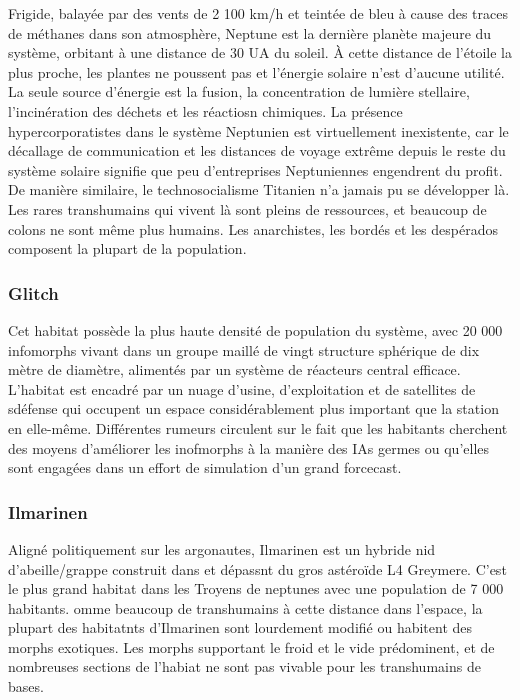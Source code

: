                                                                      Frigide, balayée par des vents de 2 100 km/h et teintée de bleu à cause des traces de méthanes dans son atmosphère, Neptune est la dernière planète majeure du système, orbitant à une distance de 30 UA du soleil. À cette distance de l'étoile la plus proche, les plantes ne poussent pas et l'énergie solaire n'est d'aucune utilité. La seule source d'énergie est la fusion, la concentration de lumière stellaire, l'incinération des déchets et les réactiosn chimiques. La présence hypercorporatistes dans le système Neptunien est virtuellement inexistente, car le décallage de communication et les distances de voyage extrême depuis le reste du système solaire signifie que peu d'entreprises Neptuniennes engendrent du profit. De manière similaire, le technosocialisme Titanien n'a jamais pu se développer là. Les rares transhumains qui vivent là sont pleins de ressources, et beaucoup de colons ne sont même plus humains. Les anarchistes, les bordés et les despérados composent la plupart de la population. 

                                                                     \subsubsection{Glitch} \label{sec:glitch} 

                                                                     Cet habitat possède la plus haute densité de population du système, avec 20 000 infomorphs vivant dans un groupe maillé de vingt structure sphérique de dix mètre de diamètre, alimentés par un système de réacteurs central efficace. L'habitat est encadré par un nuage d'usine, d'exploitation et de satellites de sdéfense qui occupent un espace considérablement plus important que la station en elle-même. Différentes rumeurs circulent sur le fait que les habitants cherchent des moyens d'améliorer les inofmorphs à la manière des IAs germes ou qu'elles sont engagées dans un effort de simulation d'un grand forcecast. 

                                                                     \subsubsection{Ilmarinen} \label{sec:ilmarinen} 

                                                                     Aligné politiquement sur les argonautes, Ilmarinen est un hybride nid d'abeille/grappe construit dans et dépassnt du gros astéroïde L4 Greymere. C'est le plus grand habitat dans les Troyens de neptunes avec une population de 7 000 habitants. omme beaucoup de transhumains à cette distance dans l'espace, la plupart des habitatnts d'Ilmarinen sont lourdement modifié ou habitent des morphs exotiques. Les morphs supportant le froid et le vide prédominent, et de nombreuses sections de l'habiat ne sont pas vivable pour les transhumains de bases. 

